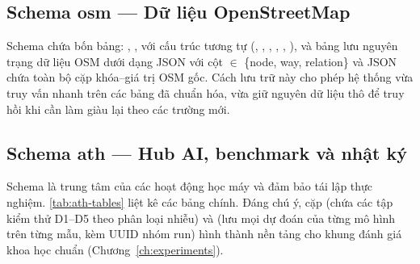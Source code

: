 \subsection{Schema osm --- Dữ liệu OpenStreetMap}
\label{sec:schema-osm}

Schema  chứa bốn bảng: , ,  với cấu trúc tương tự (, , , , , ), và bảng  lưu nguyên trạng dữ liệu OSM dưới dạng JSON với cột  $\in$ \{node, way, relation\} và  JSON chứa toàn bộ cặp khóa--giá trị OSM gốc. Cách lưu trữ này cho phép hệ thống vừa truy vấn nhanh trên các bảng đã chuẩn hóa, vừa giữ nguyên dữ liệu thô để truy hồi khi cần làm giàu lại theo các trường mới.

\subsection{Schema ath --- Hub AI, benchmark và nhật ký}
\label{sec:schema-ath}

Schema  là trung tâm của các hoạt động học máy và đảm bảo tái lập thực nghiệm. \cref{tab:ath-tables} liệt kê các bảng chính. Đáng chú ý, cặp  (chứa các tập kiểm thử D1--D5 theo phân loại nhiễu) và  (lưu mọi dự đoán của từng mô hình trên từng mẫu, kèm UUID nhóm run) hình thành nền tảng cho khung đánh giá khoa học chuẩn (Chương~\ref{ch:experiments}).

